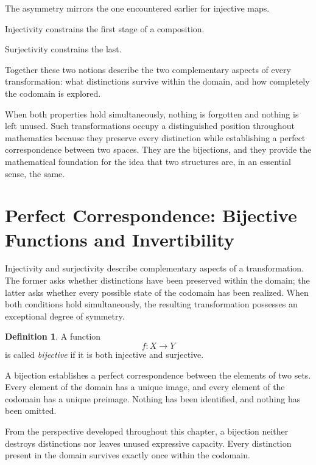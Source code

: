 \documentclass[11pt]{book}
\numberwithin{equation}{chapter}
\theoremstyle{definition}
\newtheorem{definition}{Definition}[chapter]
\theoremstyle{plain}
\theoremstyle{remark}
\begin{document}
The asymmetry mirrors the one encountered earlier for injective maps.

Injectivity constrains the first stage of a composition.

Surjectivity constrains the last.

Together these two notions describe the two complementary aspects of every transformation: what distinctions survive within the domain, and how completely the codomain is explored.

When both properties hold simultaneously, nothing is forgotten and nothing is left unused. Such transformations occupy a distinguished position throughout mathematics because they preserve every distinction while establishing a perfect correspondence between two spaces. They are the bijections, and they provide the mathematical foundation for the idea that two structures are, in an essential sense, the same.


\section{Perfect Correspondence: Bijective Functions and Invertibility}

Injectivity and surjectivity describe complementary aspects of a transformation. The former asks whether distinctions have been preserved within the domain; the latter asks whether every possible state of the codomain has been realized. When both conditions hold simultaneously, the resulting transformation possesses an exceptional degree of symmetry.

\begin{definition}
A function
\[
f:X\rightarrow Y
\]
is called \emph{bijective} if it is both injective and surjective.
\end{definition}

A bijection establishes a perfect correspondence between the elements of two sets. Every element of the domain has a unique image, and every element of the codomain has a unique preimage. Nothing has been identified, and nothing has been omitted.

From the perspective developed throughout this chapter, a bijection neither destroys distinctions nor leaves unused expressive capacity. Every distinction present in the domain survives exactly once within the codomain.
\end{document}
